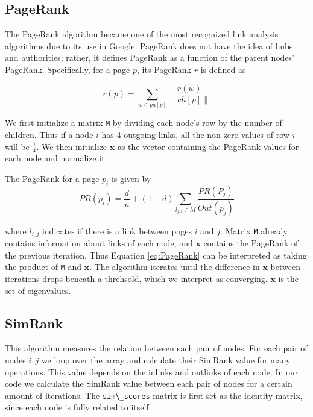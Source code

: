 \documentclass[
  paper=a4,
,captions=tableheading
]{scrartcl}
\newcommand{\passthrough}[1]{#1}
\begin{document}
\hypertarget{pagerank}{%
\subsection{PageRank}\label{pagerank}}

The PageRank algorithm became one of the most recognized link analysis
algorithms due to its use in Google. PageRank does not have the idea of
hubs and authorities; rather, it defines PageRank as a function of the
parent nodes' PageRank. Specifically, for a page \(p\), its PageRank
\(r\) is defined as

\begin{equation}
    r(p) = \sum_{w\in pa[p]}\frac{r(w)}{\|ch[p]\|}
\end{equation}

We first initialize a matrix \passthrough{\lstinline!M!} by dividing
each node's row by the number of children. Thus if a node \(i\) has 4
outgoing links, all the non-zero values of row \(i\) will be
\(\frac{1}{4}\). We then initialize \(\mathbf{x}\) as the vector
containing the PageRank values for each node and normalize it.

The PageRank for a page \(p_{i}\) is given by \begin{equation}
\label{eq:PageRank}
PR(p_{i}) = \frac{d}{n}+(1-d)\sum_{l_{j,i}\in M}\frac{PR(P_{j})}{Out(p_{j})}
\end{equation}

where \(l_{i,j}\) indicates if there is a link between pages \(i\) and
\(j\). Matrix \passthrough{\lstinline!M!} already contains information
about links of each node, and \(\mathbf{x}\) contains the PageRank of
the previous iteration. Thus Equation \ref{eq:PageRank} can be
interpreted as taking the product of \passthrough{\lstinline!M!} and
\(\mathbf{x}\). The algorithm iterates until the difference in
\(\mathbf{x}\) between iterations drops beneath a threhsold, which we
interpret as converging. \(\mathbf{x}\) is the set of eigenvalues.

\hypertarget{simrank}{%
\subsection{SimRank}\label{simrank}}

This algorithm measures the relation between each pair of nodes. For
each pair of nodes \(i,j\) we loop over the array and calculate their
SimRank value for many operations. This value depends on the inlinks and
outlinks of each node. In our code we calculate the SimRank value
between each pair of nodes for a certain amount of iterations. The
\passthrough{\lstinline!sim\_scores!} matrix is first set as the
identity matrix, since each node is fully related to itself.
\end{document}
